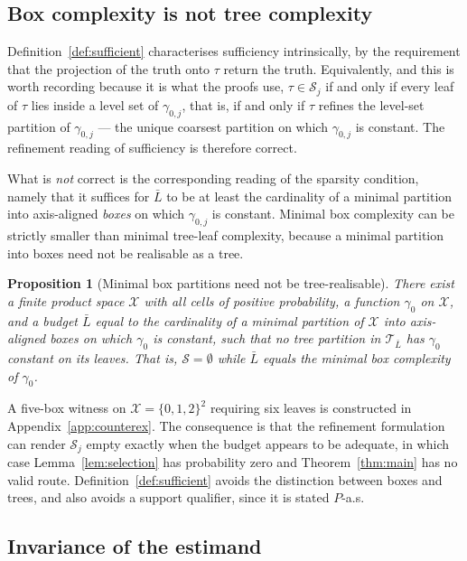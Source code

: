 \documentclass[11pt]{article}
\theoremstyle{plain}
\newtheorem{proposition}[theorem]{Proposition}
\theoremstyle{definition}
\theoremstyle{remark}
\newcommand{\cX}{\mathcal{X}}
\newcommand{\cT}{\mathcal{T}}
\newcommand{\cS}{\mathcal{S}}
\begin{document}
\subsection{Box complexity is not tree complexity}

Definition~\ref{def:sufficient} characterises sufficiency intrinsically, by the
requirement that the projection of the truth onto $\tau$ return the truth.
Equivalently, and this is worth recording because it is what the proofs use,
$\tau\in\cS_j$ if and only if every leaf of $\tau$ lies inside a level set of
$\gamma_{0,j}$, that is, if and only if $\tau$ refines the level-set partition of
$\gamma_{0,j}$ --- the unique coarsest partition on which $\gamma_{0,j}$ is
constant. The refinement reading of sufficiency is therefore correct.

What is \emph{not} correct is the corresponding reading of the sparsity
condition, namely that it suffices for $\bar L$ to be at least the cardinality of
a minimal partition into axis-aligned \emph{boxes} on which $\gamma_{0,j}$ is
constant. Minimal box complexity can be strictly smaller than minimal tree-leaf
complexity, because a minimal partition into boxes need not be realisable as a
tree.

\begin{proposition}[Minimal box partitions need not be tree-realisable]
\label{prop:pinwheel}
There exist a finite product space $\cX$ with all cells of positive
probability, a function $\gamma_0$ on $\cX$, and a budget $\bar L$ equal to the
cardinality of a minimal partition of $\cX$ into axis-aligned boxes on which
$\gamma_0$ is constant, such that no tree partition in $\cT_{\bar L}$ has
$\gamma_0$ constant on its leaves. That is, $\cS=\emptyset$ while
$\bar L$ equals the minimal box complexity of $\gamma_0$.
\end{proposition}

\noindent A five-box witness on $\cX=\{0,1,2\}^2$ requiring six leaves is
constructed in Appendix~\ref{app:counterex}. The consequence is that the
refinement formulation can render $\cS_j$ empty exactly when the budget appears
to be adequate, in which case Lemma~\ref{lem:selection} has probability zero and
Theorem~\ref{thm:main} has no valid route. Definition~\ref{def:sufficient}
avoids the distinction between boxes and trees, and also avoids a support
qualifier, since it is stated $P$-a.s.

\subsection{Invariance of the estimand}
\end{document}
